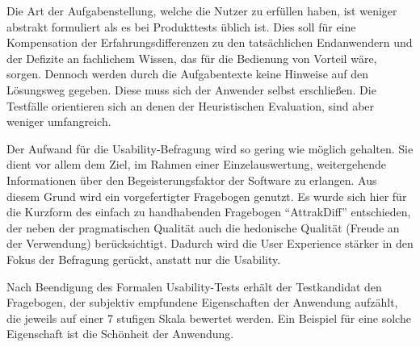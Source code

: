 Die Art der Aufgabenstellung, welche die Nutzer zu erfüllen haben, ist weniger abstrakt formuliert als es bei Produkttests üblich ist. Dies soll für eine Kompensation der Erfahrungsdifferenzen zu den tatsächlichen Endanwendern und der Defizite an fachlichem Wissen, das für die Bedienung von Vorteil wäre, sorgen. Dennoch werden durch die Aufgabentexte keine Hinweise auf den Lösungsweg gegeben. Diese muss sich der Anwender selbst erschließen. Die Testfälle orientieren sich an denen der Heuristischen Evaluation, sind aber weniger umfangreich.\par
{}\par
{}
Der Aufwand für die Usability-Befragung wird so gering wie möglich gehalten. Sie dient vor allem dem Ziel, im Rahmen einer Einzelauswertung, weitergehende Informationen über den Begeisterungsfaktor der Software zu erlangen. Aus diesem Grund wird ein vorgefertigter Fragebogen genutzt. Es wurde sich hier für die Kurzform des einfach zu handhabenden Fragebogen \enquote{AttrakDiff} entschieden, der neben der pragmatischen Qualität auch die hedonische Qualität (Freude an der Verwendung) berücksichtigt. Dadurch wird die User Experience stärker in den Fokus der Befragung gerückt, anstatt nur die Usability.\par
Nach Beendigung des Formalen Usability-Tests erhält der Testkandidat den Fragebogen, der  subjektiv empfundene Eigenschaften der Anwendung aufzählt, die jeweils auf einer 7 stufigen Skala bewertet werden. Ein Beispiel für eine solche Eigenschaft ist die Schönheit der Anwendung.\par
{}

